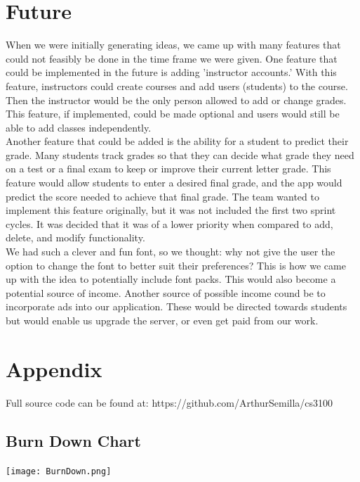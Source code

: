 \documentclass[a4paper]{article} %
\begin{document}
\section{Future}
When we were initially generating ideas, we came up with many features that could not feasibly be done in the time frame we were given. One feature that could be implemented in the future is adding 'instructor accounts.'  With this feature, instructors could create courses and add users (students) to the course. Then the instructor would be the only person allowed to add or change grades. This feature, if implemented, could be made optional and users would still be able to add classes independently.
\\
Another feature that could be added is the ability for a student to predict their grade. Many students track grades so that they can decide what grade they need on a test or a final exam to keep or improve their current letter grade. This feature would allow students to enter a desired final grade, and the app would predict the score needed to achieve that final grade. The team wanted to implement this feature originally, but it was not included the first two sprint cycles. It was decided that it was of a lower priority when compared to add, delete, and modify functionality.
\\
We had such a clever and fun font, so we thought: why not give the user the option to change the font to better suit their preferences? This is how we came up with the idea to potentially include font packs. This would also become a potential source of income. Another source of possible income cound be to incorporate ads into our application. These would be directed towards students but would enable us upgrade the server, or even get paid from our work.


\section{Appendix}

Full source code can be found at: https://github.com/ArthurSemilla/cs3100

\subsection{Burn Down Chart} \label{Burn}
\texttt{[image: BurnDown.png]}
\end{document}
